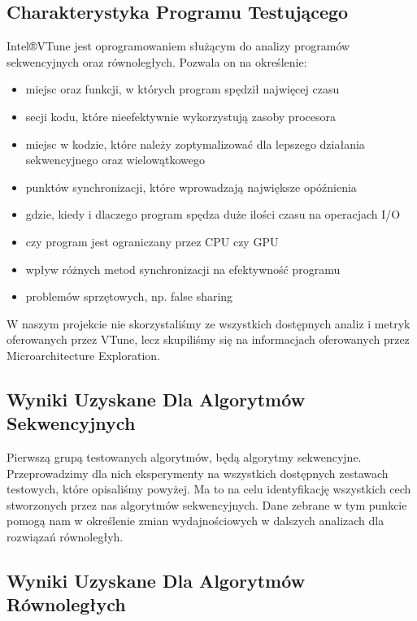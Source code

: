\documentclass{article}
\begin{document}
        \subsection{Charakterystyka Programu Testującego}
            Intel®VTune jest oprogramowaniem służącym do analizy programów sekwencyjnych oraz równoległych. Pozwala on na określenie:
            \begin{itemize}
                \item miejsc oraz funkcji, w których program spędził najwięcej czasu
                \item secji kodu, które nieefektywnie wykorzystują zasoby procesora
                \item miejsc w kodzie, które należy zoptymalizować dla lepszego działania sekwencyjnego oraz wielowątkowego
                \item punktów synchronizacji, które wprowadzają największe opóźnienia
                \item gdzie, kiedy i dlaczego program spędza duże ilości czasu na operacjach I/O
                \item czy program jest ograniczany przez CPU czy GPU
                \item wpływ różnych metod synchronizacji na efektywność programu
                \item problemów sprzętowych, np. false sharing
            \end{itemize}
            W naszym projekcie nie skorzystaliśmy ze wszystkich dostępnych analiz i metryk oferowanych przez VTune, lecz skupiliśmy się na informacjach oferowanych przez Microarchitecture Exploration.
        
        \subsection{Wyniki Uzyskane Dla Algorytmów Sekwencyjnych}
            Pierwszą grupą testowanych algorytmów, będą algorytmy sekwencyjne. Przeprowadzimy dla nich eksperymenty na wszystkich dostępnych zestawach testowych, które opisaliśmy powyżej. Ma to na celu identyfikację wszystkich cech stworzonych przez nas algorytmów sekwencyjnych. Dane zebrane w tym punkcie pomogą nam w określenie zmian wydajnościowych w dalszych analizach dla rozwiązań równoległyh.
            
            
        \subsection{Wyniki Uzyskane Dla Algorytmów Równoległych}
            
        
    
    \clearpage
    \printnoidxglossaries
\end{document}
